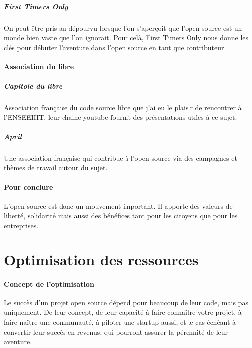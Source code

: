 				\subparagraph{First Timers Only}

				On peut être pris au dépourvu lorsque l'on s'aperçoit que l'open source est un monde bien vaste que l'on ignorait. Pour celà, First Timers Only nous donne les clés pour débuter l'aventure dans l'open source en tant que contributeur.


			\paragraph{Association du libre\\}

				\subparagraph{Capitole du libre}
				Association française du code source libre que j’ai eu le plaisir de rencontrer à l’ENSEEIHT, leur chaîne youtube fournit des présentations utiles à ce sujet.

				\subparagraph{April}
				Une association française qui contribue à l’open source via des campagnes et thèmes de travail autour du sujet.
		
		\paragraph{Pour conclure\\}

			L’open source est donc un mouvement important. Il apporte des valeurs de liberté, solidarité mais aussi des bénéfices tant pour les citoyens que pour les entreprises. 
		
	\section{Optimisation des ressources} %

		\paragraph{Concept de l'optimisation\\}

	 		Le succès d'un projet open source dépend pour beaucoup de leur code, mais pas uniquement. De leur concept, de leur capacité à faire connaître votre projet, à faire naître une communauté, à piloter une startup aussi, et le cas échéant à convertir leur succès en revenus, qui pourront assurer la pérennité de leur aventure.

